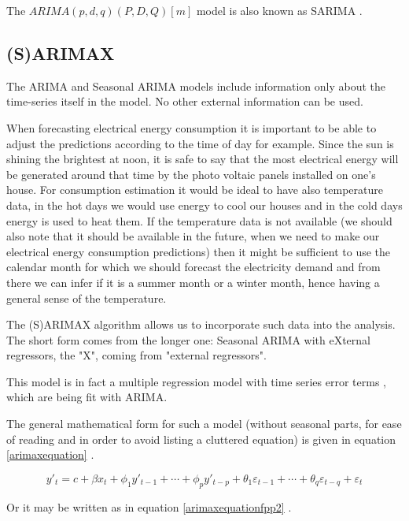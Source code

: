 \documentclass[12pt,a4paper,titlepage]{report}
\begin{document}
The $ ARIMA(p, d, q)(P, D, Q)[m] $ model is also known as SARIMA \cite{berkleysarimamodels}.

\subsection{(S)ARIMAX} \label{sarimaxsection}
The ARIMA and Seasonal ARIMA models include information only about the time-series itself in the model. No other external information can be used.

When forecasting electrical energy consumption it is important to be able to adjust the predictions according to the time of day for example. Since the sun is shining the brightest at noon, it is safe to say that the most electrical energy will be generated around that time by the photo voltaic panels installed on one's house. For consumption estimation it would be ideal to have also temperature data, in the hot days we would use energy to cool our houses and in the cold days energy is used to heat them. If the temperature data is not available (we should also note that it should be available in the future, when we need to make our electrical energy consumption predictions) then it might be sufficient to use the calendar month for which we should forecast the electricity demand and from there we can infer if it is a summer month or a winter month, hence having a general sense of the temperature.

The (S)ARIMAX algorithm allows us to incorporate such data into the analysis. The short form comes from the longer one: Seasonal ARIMA with eXternal regressors, the "X", coming from "external regressors".

This model is in fact a multiple regression model with time series error terms \cite{boxjenkins}, which are being fit with ARIMA.

The general mathematical form for such a model (without seasonal parts, for ease of reading and in order to avoid listing a cluttered equation) is given in equation \ref{arimaxequation} \cite{nauarimax}.

\begin{equation}
y'_{t} = c + \beta x_{t} + \phi_{1}y'_{t-1} + \cdots + \phi_{p}y'_{t-p} + \theta_{1}\varepsilon_{t-1} + \cdots + \theta_{q}\varepsilon_{t-q} + \varepsilon_{t} 
\label{arimaxequation}
\end{equation}

Or it may be written as in equation \ref{arimaxequationfpp2} \cite{hyndmanarimax} \cite{fpp2arimax}.
\end{document}
